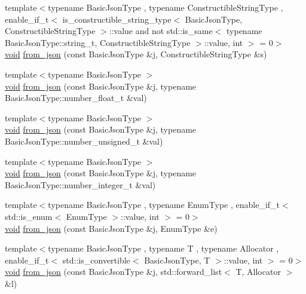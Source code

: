 \begin{DoxyCompactItemize}
\item 
{\footnotesize template$<$typename Basic\+Json\+Type , typename Constructible\+String\+Type , enable\+\_\+if\+\_\+t$<$ is\+\_\+constructible\+\_\+string\+\_\+type$<$ Basic\+Json\+Type, Constructible\+String\+Type $>$\+::value and not std\+::is\+\_\+same$<$ typename Basic\+Json\+Type\+::string\+\_\+t, Constructible\+String\+Type $>$\+::value, int $>$  = 0$>$ }\\\mbox{\hyperlink{namespacenlohmann_1_1detail_a59fca69799f6b9e366710cb9043aa77d}{void}} \mbox{\hyperlink{namespacenlohmann_1_1detail_a2932f2bc2943dac6d51669312f4fc0f5}{from\+\_\+json}} (const Basic\+Json\+Type \&j, Constructible\+String\+Type \&s)
\item 
{\footnotesize template$<$typename Basic\+Json\+Type $>$ }\\\mbox{\hyperlink{namespacenlohmann_1_1detail_a59fca69799f6b9e366710cb9043aa77d}{void}} \mbox{\hyperlink{namespacenlohmann_1_1detail_a7cb5dd7d46a60e65f9a8e0873b3f7dd8}{from\+\_\+json}} (const Basic\+Json\+Type \&j, typename Basic\+Json\+Type\+::number\+\_\+float\+\_\+t \&val)
\item 
{\footnotesize template$<$typename Basic\+Json\+Type $>$ }\\\mbox{\hyperlink{namespacenlohmann_1_1detail_a59fca69799f6b9e366710cb9043aa77d}{void}} \mbox{\hyperlink{namespacenlohmann_1_1detail_ace4d5680ba413d9fd897ccb5d9c61a1c}{from\+\_\+json}} (const Basic\+Json\+Type \&j, typename Basic\+Json\+Type\+::number\+\_\+unsigned\+\_\+t \&val)
\item 
{\footnotesize template$<$typename Basic\+Json\+Type $>$ }\\\mbox{\hyperlink{namespacenlohmann_1_1detail_a59fca69799f6b9e366710cb9043aa77d}{void}} \mbox{\hyperlink{namespacenlohmann_1_1detail_a047d881e611fcac709dc318f730a1732}{from\+\_\+json}} (const Basic\+Json\+Type \&j, typename Basic\+Json\+Type\+::number\+\_\+integer\+\_\+t \&val)
\item 
{\footnotesize template$<$typename Basic\+Json\+Type , typename Enum\+Type , enable\+\_\+if\+\_\+t$<$ std\+::is\+\_\+enum$<$ Enum\+Type $>$\+::value, int $>$  = 0$>$ }\\\mbox{\hyperlink{namespacenlohmann_1_1detail_a59fca69799f6b9e366710cb9043aa77d}{void}} \mbox{\hyperlink{namespacenlohmann_1_1detail_a5440d650150d01e8015133521351b459}{from\+\_\+json}} (const Basic\+Json\+Type \&j, Enum\+Type \&e)
\item 
{\footnotesize template$<$typename Basic\+Json\+Type , typename T , typename Allocator , enable\+\_\+if\+\_\+t$<$ std\+::is\+\_\+convertible$<$ Basic\+Json\+Type, T $>$\+::value, int $>$  = 0$>$ }\\\mbox{\hyperlink{namespacenlohmann_1_1detail_a59fca69799f6b9e366710cb9043aa77d}{void}} \mbox{\hyperlink{namespacenlohmann_1_1detail_a5cfb765aad92795abd7fda29d017272a}{from\+\_\+json}} (const Basic\+Json\+Type \&j, std\+::forward\+\_\+list$<$ T, Allocator $>$ \&l)

\end{DoxyCompactItemize}
